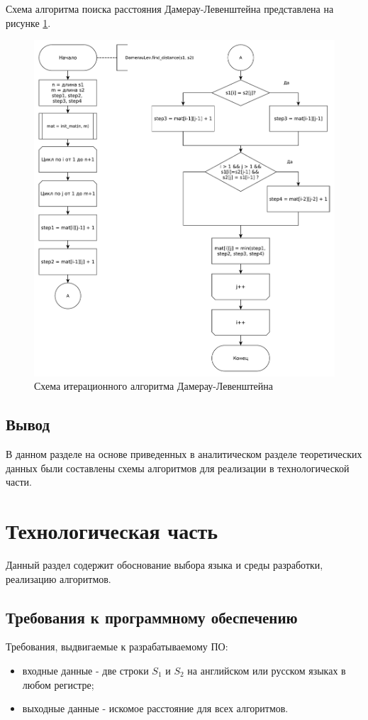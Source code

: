 \documentclass[a4paper,oneside,14pt]{extreport}
\begin{document}
Схема алгоритма поиска расстояния Дамерау-Левенштейна представлена на рисунке \ref{fig:dam_lev}.
\begin{figure}[H]
	\centering
	\includegraphics[width=1\linewidth]{images/damerayLevenshtain}
	\caption{Схема итерационного алгоритма Дамерау-Левенштейна}
	\label{fig:dam_lev}
\end{figure}

\section{Вывод}
В данном разделе на основе приведенных в аналитическом разделе теоретических данных были составлены схемы алгоритмов для реализации в технологической части.
\newpage

\chapter{Технологическая часть}
Данный раздел содержит обоснование выбора языка и среды разработки, реализацию алгоритмов.

\section{Требования к программному обеспечению}
Требования, выдвигаемые к разрабатываемому ПО:
\begin{itemize}
	\item входные данные - две строки $S_{1}$ и $S_{2}$ на английском или русском языках в любом регистре;
	\item выходные данные - искомое расстояние для всех алгоритмов.
\end{itemize}
\end{document}
